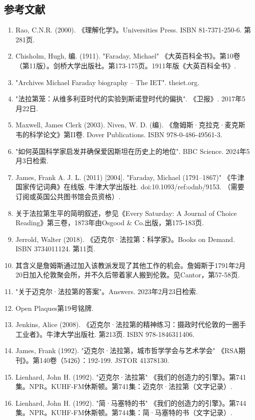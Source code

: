 \subsection{参考文献}
\begin{enumerate}
\item Rao, C.N.R. (2000). 《理解化学》。Universities Press. ISBN 81-7371-250-6. 第281页.
\item Chisholm, Hugh, 编. (1911). "Faraday, Michael" 《大英百科全书》。第10卷（第11版）。剑桥大学出版社。第173-175页。1911年版《大英百科全书》.
\item "Archives Michael Faraday biography – The IET". theiet.org.
\item "法拉第笼：从维多利亚时代的实验到斯诺登时代的偏执". 《卫报》. 2017年5月22日.
\item Maxwell, James Clerk (2003). Niven, W. D. (编). 《詹姆斯·克拉克·麦克斯韦的科学论文》第II卷. Dover Publications. ISBN 978-0-486-49561-3.
\item "如何英国科学家启发并确保爱因斯坦在历史上的地位". BBC Science. 2024年5月3日检索.
\item James, Frank A. J. L. (2011) [2004]. "Faraday, Michael (1791–1867)" 《牛津国家传记词典》在线版. 牛津大学出版社. doi:10.1093/ref:odnb/9153. （需要订阅或英国公共图书馆会员资格）.
\item 关于法拉第生平的简明叙述，参见《Every Saturday: A Journal of Choice Reading》第三卷，1873年由Osgood & Co.出版，第175-183页.
\item Jerrold, Walter (2018). 《迈克尔·法拉第：科学家》。Books on Demand. ISBN 3734011124. 第11页.
\item 其含义是詹姆斯通过加入该教派发现了其他工作的机会。詹姆斯于1791年2月20日加入伦敦聚会所，并不久后带着家人搬到伦敦。见Cantor，第57-58页.
\item "关于迈克尔·法拉第的答案"。Answers. 2023年2月23日检索.
\item Open Plaques第19号铭牌.
\item Jenkins, Alice (2008). 《迈克尔·法拉第的精神练习：摄政时代伦敦的一圈手工业者》。牛津大学出版社. 第213页. ISBN 978-1846311406.
\item James, Frank (1992). "迈克尔·法拉第，城市哲学学会与艺术学会" 《RSA期刊》。第140卷（5426）：192-199. JSTOR 41378130.
\item Lienhard, John H. (1992). "迈克尔·法拉第" 《我们的创造力的引擎》。第741集。NPR。KUHF-FM休斯顿。第741集：迈克尔·法拉第（文字记录）.
\item Lienhard, John H. (1992). "简·马塞特的书" 《我们的创造力的引擎》。第744集。NPR。KUHF-FM休斯顿。第744集：简·马塞特的书（文字记录）.

\end{enumerate}
